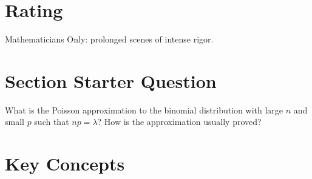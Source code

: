 \documentclass[12pt]{article}
\begin{document}
\myheader \mytitle

\hr


\hr

\usefirefox

\hr



\section*{Rating} %
Mathematicians Only:  prolonged scenes of intense rigor.

\hr

\section*{Section Starter Question}

What is the Poisson approximation to the binomial distribution with
large \( n \) and small \( p \) such that \( np = \lambda \)?  How is
the approximation usually proved?

\hr

\section*{Key Concepts}
\end{document}

